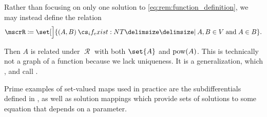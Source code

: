 \begin{remark}
  Rather than focusing on only one solution to \eqref{eq:rem:function_definition}, we may instead define the relation
  \begin{equation*}
    \mscrR \coloneqq \set[\Big]{ (A, B) \given* A, B \in V \T{and} A \in B }.
  \end{equation*}

  Then \( A \) is related under \( \mscrR \) with both \( \set{ A } \) and \( \operatorname{pow}(A) \). This is technically not a graph of a function because we lack uniqueness. It is a generalization, which ,  and  call .

  Prime examples of set-valued maps used in practice are the subdifferentials defined in , as well as solution mappings which provide sets of solutions to some equation that depends on a parameter.
\end{remark}


